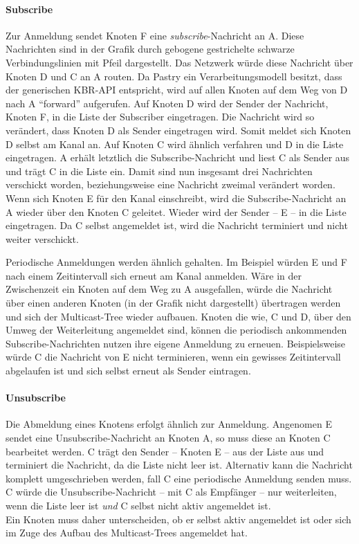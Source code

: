 \paragraph{Subscribe}
Zur Anmeldung sendet Knoten F eine \emph{subscribe}-Nachricht an A. Diese Nachrichten sind in der Grafik durch gebogene gestrichelte schwarze Verbindungslinien mit Pfeil dargestellt. Das Netzwerk würde diese Nachricht über Knoten D und C an A routen. Da Pastry ein Verarbeitungsmodell besitzt, dass der generischen KBR-API entspricht, wird auf allen Knoten auf dem Weg von D nach A ``forward'' aufgerufen. Auf Knoten D wird der Sender der Nachricht, Knoten F, in die Liste der Subscriber eingetragen. Die Nachricht wird so verändert, dass Knoten D als Sender eingetragen wird. Somit meldet sich Knoten D selbst am Kanal an. Auf Knoten C wird ähnlich verfahren und D in die Liste eingetragen. A erhält letztlich die Subscribe-Nachricht und liest C als Sender aus und trägt C in die Liste ein. Damit sind nun insgesamt drei Nachrichten verschickt worden, beziehungsweise eine Nachricht zweimal verändert worden.\\
Wenn sich Knoten E für den Kanal einschreibt, wird die Subscribe-Nachricht an A wieder über den Knoten C geleitet. Wieder wird der Sender -- E -- in die Liste eingetragen. Da C selbst angemeldet ist, wird die Nachricht terminiert und nicht weiter verschickt.

Periodische Anmeldungen werden ähnlich gehalten. Im Beispiel würden E und F nach einem Zeitintervall sich erneut am Kanal anmelden. Wäre in der Zwischenzeit ein Knoten auf dem Weg zu A ausgefallen, würde die Nachricht über einen anderen Knoten (in der Grafik nicht dargestellt) übertragen werden und sich der Multicast-Tree wieder aufbauen. Knoten die wie, C und D, über den Umweg der Weiterleitung angemeldet sind, können die periodisch ankommenden Subscribe-Nachrichten nutzen ihre eigene Anmeldung zu erneuen. Beispielsweise würde C die Nachricht von E nicht terminieren, wenn ein gewisses Zeitintervall abgelaufen ist und sich selbst erneut als Sender eintragen.

\paragraph{Unsubscribe}
Die Abmeldung eines Knotens erfolgt ähnlich zur Anmeldung. Angenomen E sendet eine Unsubscribe-Nachricht an Knoten A, so muss diese an Knoten C bearbeitet werden. C trägt den Sender -- Knoten E -- aus der Liste aus und terminiert die Nachricht, da die Liste nicht leer ist. Alternativ kann die Nachricht komplett umgeschrieben werden, fall C eine periodische Anmeldung senden muss. C würde die Unsubscribe-Nachricht -- mit C als Empfänger -- nur weiterleiten, wenn die Liste leer ist \emph{und} C selbst nicht aktiv angemeldet ist.\\
Ein Knoten muss daher unterscheiden, ob er selbst aktiv angemeldet ist oder sich im Zuge des Aufbau des Multicast-Trees angemeldet hat.

